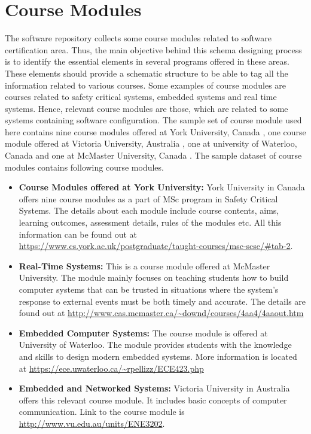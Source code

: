 \documentclass[11pt,letterpaper]{report}
\begin{document}
\chapter{Course Modules}
\label{chap:CM}
The software repository collects some course modules related to software certification area. Thus, the main objective behind this schema designing process is to identify the essential elements in several programs offered in these areas. These elements should provide a schematic structure to be able to tag all the information related to various courses. Some examples of course modules are courses related to safety critical systems, embedded systems and real time systems. Hence, relevant course modules are those, which are related to some systems containing software configuration. The sample set of course module used here contains nine course modules offered at York University, Canada \cite{York}, one course module offered at Victoria University, Australia \cite{Victoria}, one at university of Waterloo, Canada \cite{Waterloo} and one at McMaster University, Canada \cite{MaC}. The sample dataset of course modules contains following course modules. 
\begin{itemize}
\item \textbf{Course Modules offered at York University: } York University in Canada offers nine course modules as a part of MSc program in Safety Critical Systems. The details about each module include course contents, aims, learning outcomes, assessment details, rules of the modules etc. All this information can be found out at \url{https://www.cs.york.ac.uk/postgraduate/taught-courses/msc-scse/#tab-2}. \cite{York}   
\item \textbf{Real-Time Systems: } This is a course module offered at McMaster University. The module mainly focuses on teaching students how to build computer systems that can be trusted in situations where the system's response to external events must be both timely and accurate. The details are found out at \url{http://www.cas.mcmaster.ca/~downd/courses/4aa4/4aaout.htm} \cite{MaC}
\item \textbf{Embedded Computer Systems: } The course module is offered at University of Waterloo. The module provides students with the knowledge and skills to design modern embedded systems. More information is located at 
\url{https://ece.uwaterloo.ca/~rpellizz/ECE423.php} \cite{Waterloo}
\item \textbf{Embedded and Networked Systems: } Victoria University in Australia offers this relevant course module.
It includes basic concepts of computer communication. Link to the course module is \url{http://www.vu.edu.au/units/ENE3202}.
\end{itemize}
\end{document}
